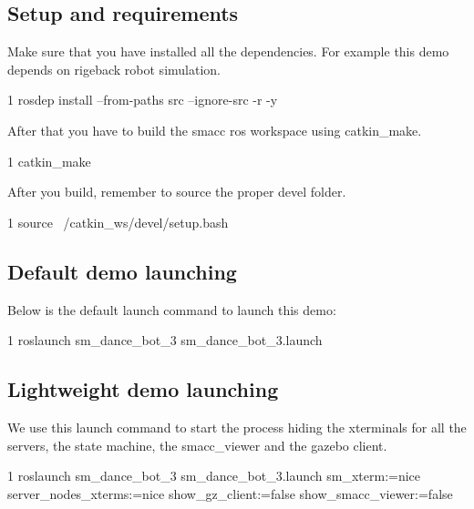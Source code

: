 \subsection*{Setup and requirements}

Make sure that you have installed all the dependencies. For example this demo depends on rigeback robot simulation.


\begin{DoxyCode}
1 rosdep install --from-paths src --ignore-src -r -y 
\end{DoxyCode}


After that you have to build the smacc ros workspace using catkin\+\_\+make.


\begin{DoxyCode}
1 catkin\_make
\end{DoxyCode}


After you build, remember to source the proper devel folder.


\begin{DoxyCode}
1 source ~/catkin\_ws/devel/setup.bash
\end{DoxyCode}


\subsection*{Default demo launching}

Below is the default launch command to launch this demo\+:


\begin{DoxyCode}
1 roslaunch sm\_dance\_bot\_3 sm\_dance\_bot\_3.launch
\end{DoxyCode}


\subsection*{Lightweight demo launching}

We use this launch command to start the process hiding the xterminals for all the servers, the state machine, the smacc\+\_\+viewer and the gazebo client.


\begin{DoxyCode}
1 roslaunch sm\_dance\_bot\_3 sm\_dance\_bot\_3.launch sm\_xterm:=nice server\_nodes\_xterms:=nice
       show\_gz\_client:=false show\_smacc\_viewer:=false
\end{DoxyCode}
 